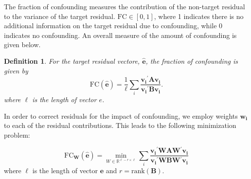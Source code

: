 \documentclass{article} %
\newtheorem{definition}{Definition}
\newcommand{\trans}{\ensuremath{^\prime}}
\newcommand{\var}{\ensuremath{\mathrm{Var}}}
\begin{document}


The fraction of confounding measures the contribution of the non-target residual to the variance of the target residual. $\text{FC} \in [0,1]$, where 1 indicates there is no additional information on the target residual due to confounding, while 0 indicates no confounding. An overall measure of the amount of confounding is given below.\\

\begin{definition}
For the target residual vectore, $\widehat{\bm{e}}$, the fraction of confounding is given by
%
\begin{equation}\label{eq:fc2}
\text{FC}(\widehat{\bm{e}}) = 
\dfrac{1}{\ell} \displaystyle{\sum_i} \frac{\bm{v_i}\trans \bm{A} \bm{v_i}}
		{\bm{v_i}\trans \bm{B} \bm{v_i}}.
\end{equation}
where $\ell$ is the length of vector $e$.

\end{definition}


In order to correct residuals for the impact of confounding, we employ weights $\bm{w_i}$ to each of the residual contributions. This leads to the following minimization problem:

\begin{equation}\label{eq:minimize}
\text{FC}_{\bm{W}}(\widehat{\bm{e}}) = \min_{W \in \mathbb{R}^{\ell-r \times \ell} } 
\displaystyle{\sum_i} \frac{\bm{v_i}\trans \bm{W} \bm{A} \bm{W}\trans \bm{v_i}}
		{\bm{v_i}\trans \bm{W} \bm{B} \bm{W}\trans \bm{v_i}}
\end{equation}
where $\ell$ is the length of vector $\bm{e}$ and $r = \text{rank}(\bm{B})$.\\
\end{document}
